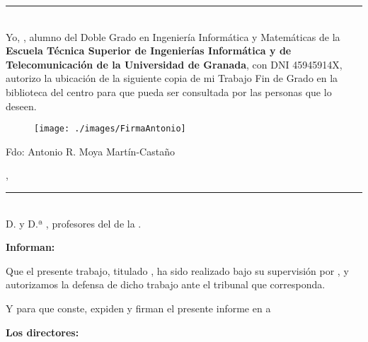 \documentclass['../proyecto.tex']{memoir}
\begin{document}
\thispagestyle{empty}

\noindent\rule[-1ex]{\textwidth}{2pt}\\[4.5ex]

Yo, \AuthorName, alumno del Doble Grado en
Ingeniería Informática y Matemáticas de la \textbf{Escuela Técnica
  Superior de Ingenierías Informática y de Telecomunicación de la
  Universidad de Granada}, con DNI 45945914X, autorizo la ubicación de
la siguiente copia de mi Trabajo Fin de Grado en la biblioteca del
centro para que pueda ser consultada por las personas que lo deseen.

\vspace{2cm}

\begin{figure}[H]
	
	\centering
	\texttt{[image: ./images/FirmaAntonio]}
	
\end{figure}

\noindent Fdo: Antonio R. Moya Martín-Castaño

\vspace{2cm}

\begin{flushright}
  \Location, \Time
\end{flushright}

\newpage

\thispagestyle{empty}

\noindent\rule[-1ex]{\textwidth}{2pt}\\[4.5ex]

D. \textbf{\MainProf} y D.ª \textbf{\SecondProf}, profesores del
\Department de la \University.

\vspace{0.5cm}

\textbf{Informan:}

\vspace{0.5cm}

Que el presente trabajo, titulado \textit{\textbf{\ProjectTitle}}, ha
sido realizado bajo su supervisión por \textbf{\AuthorName}, y
autorizamos la defensa de dicho trabajo ante el tribunal que
corresponda.

\vspace{0.5cm}

Y para que conste, expiden y firman el presente informe en \Location a \Time

\vspace{1cm}

\textbf{Los directores:}
\end{document}
